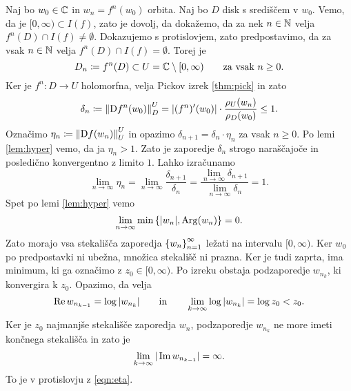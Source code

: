 

\begin{dokaz}
    Naj bo \(w_0 \in \mathbb C\) in \(w_n = f^n (w_0)\) orbita. Naj bo \(D\) disk s središčem v \(w_0\). Vemo, da je \([0, \infty) \subset I (f)\), zato je dovolj, da dokažemo, da za nek \(n \in \mathbb N\) velja \(f^n (D) \cap I (f) \neq \emptyset\). Dokazujemo s protislovjem, zato predpostavimo, da za vsak \(n \in \mathbb N\) velja \(f^n (D) \cap I (f) = \emptyset\). Torej je
    \[D_n \coloneq f^n (D) \subset U = \mathbb C \setminus [0, \infty) \qquad \text{za vsak } n \geq 0.\]
    Ker je \(f^n \colon D \to U\) holomorfna, velja Pickov izrek \ref{thm:pick} in zato
    \[\delta_n \coloneq \left\| \mathrm{D} f^n (w_0) \right\|_{D}^{U} = |(f^n)' (w_0)| \cdot \frac{\rho_U (w_n)}{\rho_D (w_0)} \leq 1.\]
    Označimo \(\eta_n \coloneq \left\| \mathrm{D} f (w_n) \right\|_{U}^{U}\) in opazimo \(\delta_{n + 1} = \delta_n \cdot \eta_n\) za vsak \(n \geq 0\). Po lemi \ref{lem:hyper} vemo, da ja \(\eta_n > 1\). Zato je zaporedje \(\delta_n\) strogo naraščajoče in posledično konvergentno z limito \(\num{1}\). Lahko izračunamo
    \[\lim_{n \to \infty} \eta_n = \lim_{n \to \infty} \frac{\delta_{n + 1}}{\delta_n} = \frac{\lim_{n \to \infty} \delta_{n + 1}}{\lim_{n \to \infty} \delta_n} = 1.\]
    Spet po lemi \ref{lem:hyper} vemo
    \[\lim_{n \to \infty} \min \left\{ |w_n|, \operatorname{Arg} (w_n) \right\} = 0.\]
    Zato morajo vsa stekališča zaporedja \(\left\{ w_n \right\}_{n = 1}^{\infty}\) ležati na intervalu \([0, \infty)\). Ker \(w_0\) po predpostavki ni ubežna, množica stekališč ni prazna. Ker je tudi zaprta, ima minimum, ki ga označimo z \(z_0 \in [0, \infty)\). Po izreku obstaja podzaporedje \(w_{n_{k}}\), ki konvergira k \(z_0\). Opazimo, da velja
    \[\operatorname{Re} w_{n_{k - 1}} = \log |w_{n_{k}}| \qquad \text{in} \qquad \lim_{k \to \infty} \log |w_{n_{k}}| = \log z_0 < z_0.\]
    Ker je \(z_0\) najmanjše stekališče zaporedja \(w_n\), podzaporedje \(w_{n_{k}}\) ne more imeti končnega stekališča in zato je
    \[\lim_{k \to \infty} |\operatorname{Im} w_{n_{k-1}}| = \infty.\]
    To je v protislovju z \eqref{eqn:eta}.
\end{dokaz}

